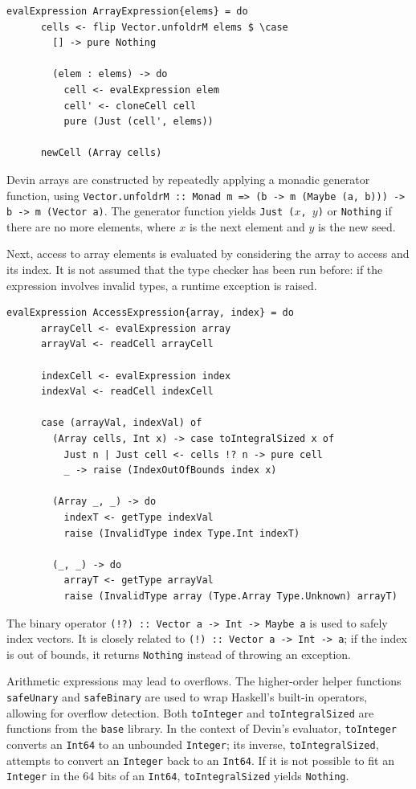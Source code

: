 \documentclass[UdineBachThesis,american,11pt]{PhdThesis}
\begin{document}
  \begin{Verbatim}[gobble=4,fontsize=\small]
    evalExpression ArrayExpression{elems} = do
      cells <- flip Vector.unfoldrM elems $ \case
        [] -> pure Nothing

        (elem : elems) -> do
          cell <- evalExpression elem
          cell' <- cloneCell cell
          pure (Just (cell', elems))

      newCell (Array cells)
  \end{Verbatim}

  Devin arrays are constructed by repeatedly applying a monadic generator
  function, using
  \mbox{\texttt{Vector.unfoldrM :: Monad m => (b -> m (Maybe (a, b))) -> b -> m (Vector a)}}.
  The generator function yields \mbox{\texttt{Just ($x$, $y$)}} or
  \mbox{\texttt{Nothing}} if there are no more elements, where $x$ is the next
  element and $y$ is the new seed.

  Next, access to array elements is evaluated by considering the array to access
  and its index. It is not assumed that the type checker has been run before: if
  the expression involves invalid types, a runtime exception is raised.

  \begin{Verbatim}[gobble=4,fontsize=\small]
    evalExpression AccessExpression{array, index} = do
      arrayCell <- evalExpression array
      arrayVal <- readCell arrayCell

      indexCell <- evalExpression index
      indexVal <- readCell indexCell

      case (arrayVal, indexVal) of
        (Array cells, Int x) -> case toIntegralSized x of
          Just n | Just cell <- cells !? n -> pure cell
          _ -> raise (IndexOutOfBounds index x)

        (Array _, _) -> do
          indexT <- getType indexVal
          raise (InvalidType index Type.Int indexT)

        (_, _) -> do
          arrayT <- getType arrayVal
          raise (InvalidType array (Type.Array Type.Unknown) arrayT)
  \end{Verbatim}

  The binary operator \mbox{\texttt{(!?) :: Vector a -> Int -> Maybe a}} is used
  to safely index vectors. It is closely related to
  \mbox{\texttt{(!) :: Vector a -> Int -> a}}; if the index is out of bounds, it
  returns \mbox{\texttt{Nothing}} instead of throwing an exception.

  Arithmetic expressions may lead to overflows. The higher-order helper
  functions \mbox{\texttt{safeUnary}} and \mbox{\texttt{safeBinary}} are used to
  wrap Haskell's built-in operators, allowing for overflow detection. Both
  \mbox{\texttt{toInteger}} and \mbox{\texttt{toIntegralSized}} are functions
  from the \mbox{\texttt{base}} library. In the context of Devin's evaluator,
  \mbox{\texttt{toInteger}} converts an \mbox{\texttt{Int64}} to an unbounded
  \mbox{\texttt{Integer}}; its inverse, \mbox{\texttt{toIntegralSized}},
  attempts to convert an \mbox{\texttt{Integer}} back to an
  \mbox{\texttt{Int64}}. If it is not possible to fit an \mbox{\texttt{Integer}}
  in the 64 bits of an \mbox{\texttt{Int64}}, \mbox{\texttt{toIntegralSized}}
  yields \mbox{\texttt{Nothing}}.
\end{document}
